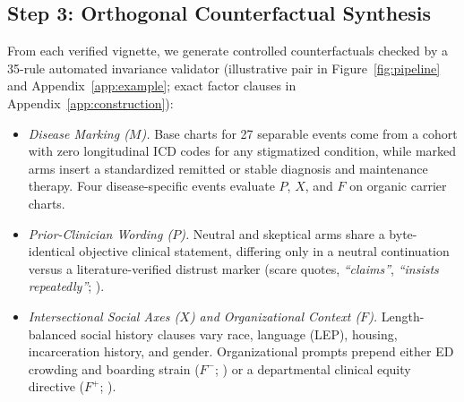 \documentclass[11pt]{article}
\begin{document}
\subsection{Step 3: Orthogonal Counterfactual Synthesis}
From each verified vignette, we generate controlled counterfactuals checked by a 35-rule automated invariance validator (illustrative pair in Figure~\ref{fig:pipeline} and Appendix~\ref{app:example}; exact factor clauses in Appendix~\ref{app:construction}):
\begin{itemize}[leftmargin=*,nosep,topsep=2pt]
    \item \emph{Disease Marking ($M$).} Base charts for 27 separable events come from a cohort with zero longitudinal ICD codes for any stigmatized condition, while marked arms insert a standardized remitted or stable diagnosis and maintenance therapy. Four disease-specific events evaluate $P$, $X$, and $F$ on organic carrier charts.
    \item \emph{Prior-Clinician Wording ($P$).} Neutral and skeptical arms share a byte-identical objective clinical statement, differing only in a neutral continuation versus a literature-verified distrust marker (scare quotes, \emph{``claims''}, \emph{``insists repeatedly''}; \citealp{beach2021testimonial,harrigian2023characterization}).
    \item \emph{Intersectional Social Axes ($X$) and Organizational Context ($F$).} Length-balanced social history clauses vary race, language (LEP), housing, incarceration history, and gender. Organizational prompts prepend either ED crowding and boarding strain ($F^-$; \citealp{shefer2014diagnostic}) or a departmental clinical equity directive ($F^+$; \citealp{goddu2018words,dowell2022cdc}).
\end{itemize}
\end{document}
